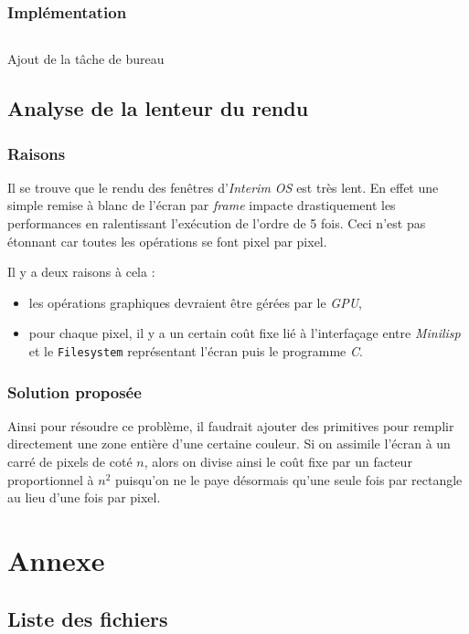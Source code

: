 \documentclass[c, 11pt, handout, xcolor=table]{beamer}
\newcommand{\source}[5]{
  \begin{table}[H]
    \centering
    \inputminted[frame=lines,linenos,style=colorful,fontfamily=tt,breaklines,autogobble,firstline=#3,firstnumber=#3,lastline=#4,label={#2[#3--#4]}]{#1}{../interim/sledge/#2}
    \captionsetup{name=Listing,labelformat=listing,labelsep=endash}
    \caption{#5}
  \end{table}
  }
\newcommand{\sourceLisp}[4]{\source{Lisp}{os/#1}{#2}{#3}{#4}}
\newcommand{\codeC}[1]{\texttt{#1}}
\newcommand{\foreign}[1]{\emph{#1}}
\begin{document}
\begin{frame}
 \frametitle{Implémentation}
 
 \sourceLisp{shell.l}{227}{234}{Ajout de la tâche de bureau}
\end{frame}



\subsection{Analyse de la lenteur du rendu}

\begin{frame}
 \frametitle{Raisons}

 Il se trouve que le rendu des fenêtres d'\foreign{Interim OS} est très lent. En effet une simple remise à blanc de l'écran par \foreign{frame} impacte drastiquement les performances en ralentissant l'exécution de l'ordre de 5 fois. Ceci n'est pas étonnant car toutes les opérations se font pixel par pixel. 
 
 Il y a deux raisons à cela :
 \begin{itemize}
  \item les opérations graphiques devraient être gérées par le \foreign{GPU},
  \item pour chaque pixel, il y a un certain coût fixe lié à l'interfaçage entre \foreign{Minilisp} et le \codeC{Filesystem} représentant l'écran puis le programme \foreign{C}.
 \end{itemize}

\end{frame}

\begin{frame}
 \frametitle{Solution proposée}
 
 Ainsi pour résoudre ce problème, il faudrait ajouter des primitives pour remplir directement une zone entière d'une certaine couleur. Si on assimile l'écran à un carré de pixels de coté $n$, alors on divise ainsi le coût fixe par un facteur proportionnel à $n^2$ puisqu'on ne le paye désormais qu'une seule fois par rectangle au lieu d'une fois par pixel.
\end{frame}


\appendix

\tiny

\section{Annexe}

\subsection{Liste des fichiers}
\end{document}
